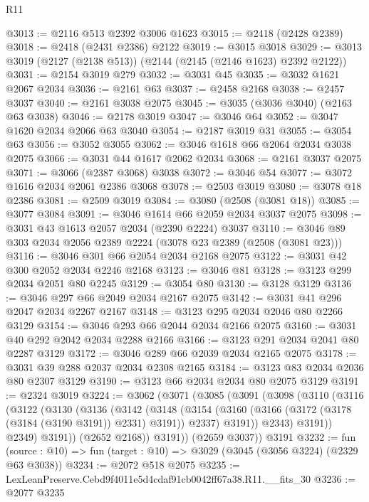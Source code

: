 \begin{lexlean}{R11}
\begin{coremodule}
@3013 := @2116 @513 @2392 @3006 @1623
@3015 := @2418 (@2428 @2389)
@3018 := @2418 (@2431 @2386) @2122
@3019 := @3015 @3018
@3029 := @3013 @3019 (@2127 (@2138 @513)) (@2144 (@2145 (@2146 @1623) @2392 @2122))
@3031 := @2154 @3019 @279
@3032 := @3031 @45
@3035 := @3032 @1621 @2067 @2034
@3036 := @2161 @63
@3037 := @2458 @2168
@3038 := @2457 @3037
@3040 := @2161 @3038 @2075
@3045 := @3035 (@3036 @3040) (@2163 @63 @3038)
@3046 := @2178 @3019
@3047 := @3046 @64
@3052 := @3047 @1620 @2034 @2066 @63 @3040
@3054 := @2187 @3019 @31
@3055 := @3054 @63
@3056 := @3052 @3055
@3062 := @3046 @1618 @66 @2064 @2034 @3038 @2075
@3066 := @3031 @44 @1617 @2062 @2034
@3068 := @2161 @3037 @2075
@3071 := @3066 (@2387 @3068) @3038
@3072 := @3046 @54
@3077 := @3072 @1616 @2034 @2061 @2386 @3068
@3078 := @2503 @3019
@3080 := @3078 @18 @2386
@3081 := @2509 @3019
@3084 := @3080 (@2508 (@3081 @18))
@3085 := @3077 @3084
@3091 := @3046 @1614 @66 @2059 @2034 @3037 @2075
@3098 := @3031 @43 @1613 @2057 @2034 (@2390 @2224) @3037
@3110 := @3046 @89 @303 @2034 @2056 @2389 @2224 (@3078 @23 @2389 (@2508 (@3081 @23)))
@3116 := @3046 @301 @66 @2054 @2034 @2168 @2075
@3122 := @3031 @42 @300 @2052 @2034 @2246 @2168
@3123 := @3046 @81
@3128 := @3123 @299 @2034 @2051 @80 @2245
@3129 := @3054 @80
@3130 := @3128 @3129
@3136 := @3046 @297 @66 @2049 @2034 @2167 @2075
@3142 := @3031 @41 @296 @2047 @2034 @2267 @2167
@3148 := @3123 @295 @2034 @2046 @80 @2266 @3129
@3154 := @3046 @293 @66 @2044 @2034 @2166 @2075
@3160 := @3031 @40 @292 @2042 @2034 @2288 @2166
@3166 := @3123 @291 @2034 @2041 @80 @2287 @3129
@3172 := @3046 @289 @66 @2039 @2034 @2165 @2075
@3178 := @3031 @39 @288 @2037 @2034 @2308 @2165
@3184 := @3123 @83 @2034 @2036 @80 @2307 @3129
@3190 := @3123 @66 @2034 @2034 @80 @2075 @3129
@3191 := @2324 @3019
@3224 := @3062
    (@3071
      (@3085
        (@3091
          (@3098
            (@3110
              (@3116
                (@3122
                  (@3130
                    (@3136
                      (@3142
                        (@3148
                          (@3154
                            (@3160 (@3166 (@3172 (@3178 (@3184 (@3190 @3191)) @2331) @3191)) @2337)
                            @3191))
                        @2343)
                      @3191))
                  @2349)
                @3191))
            (@2652 @2168))
          @3191))
      (@2659 @3037))
    @3191
@3232 := fun (source : @10) => fun (target : @10) => @3029 (@3045 (@3056 @3224) (@2329 @63 @3038))
@3234 := @2072 @518 @2075
@3235 := LexLeanPreserve.Cebd9f4011e5d4cdaf91cb0042ff67a38.R11.__fits_30
@3236 := @2077 @3235

\end{coremodule}
\end{lexlean}
